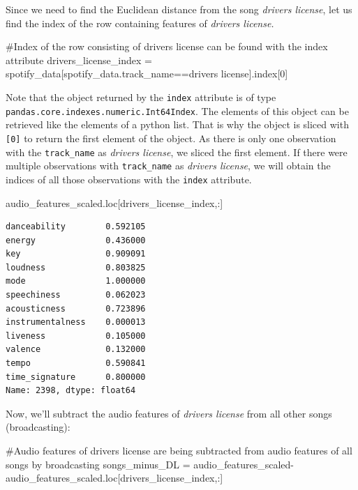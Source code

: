 \documentclass[
  letterpaper,
  DIV=11,
  numbers=noendperiod]{scrreprt}
\newenvironment{Shaded}{\begin{snugshade}}{\end{snugshade}}
\newcommand{\CommentTok}[1]{\textcolor[rgb]{0.37,0.37,0.37}{#1}}
\newcommand{\DecValTok}[1]{\textcolor[rgb]{0.68,0.00,0.00}{#1}}
\newcommand{\NormalTok}[1]{\textcolor[rgb]{0.00,0.23,0.31}{#1}}
\newcommand{\OperatorTok}[1]{\textcolor[rgb]{0.37,0.37,0.37}{#1}}
\newcommand{\StringTok}[1]{\textcolor[rgb]{0.13,0.47,0.30}{#1}}
\begin{document}
Since we need to find the Euclidean distance from the song \emph{drivers
license}, let us find the index of the row containing features of
\emph{drivers license.}

\begin{Shaded}
\begin{Highlighting}[]
\CommentTok{\#Index of the row consisting of drivers license can be found with the index attribute}
\NormalTok{drivers\_license\_index }\OperatorTok{=}\NormalTok{ spotify\_data[spotify\_data.track\_name}\OperatorTok{==}\StringTok{\textquotesingle{}drivers license\textquotesingle{}}\NormalTok{].index[}\DecValTok{0}\NormalTok{]}
\end{Highlighting}
\end{Shaded}

Note that the object returned by the \texttt{index} attribute is of type
\texttt{pandas.core.indexes.numeric.Int64Index}. The elements of this
object can be retrieved like the elements of a python list. That is why
the object is sliced with \texttt{{[}0{]}} to return the first element
of the object. As there is only one observation with the
\texttt{track\_name} as \emph{drivers license}, we sliced the first
element. If there were multiple observations with \texttt{track\_name}
as \emph{drivers license}, we will obtain the indices of all those
observations with the \texttt{index} attribute.

\begin{Shaded}
\begin{Highlighting}[]
\NormalTok{audio\_features\_scaled.loc[drivers\_license\_index,:]}
\end{Highlighting}
\end{Shaded}

\begin{verbatim}
danceability        0.592105
energy              0.436000
key                 0.909091
loudness            0.803825
mode                1.000000
speechiness         0.062023
acousticness        0.723896
instrumentalness    0.000013
liveness            0.105000
valence             0.132000
tempo               0.590841
time_signature      0.800000
Name: 2398, dtype: float64
\end{verbatim}

Now, we'll subtract the audio features of \emph{drivers license} from
all other songs (broadcasting):

\begin{Shaded}
\begin{Highlighting}[]
\CommentTok{\#Audio features of drivers license are being subtracted from audio features of all songs by broadcasting}
\NormalTok{songs\_minus\_DL }\OperatorTok{=}\NormalTok{ audio\_features\_scaled}\OperatorTok{{-}}\NormalTok{audio\_features\_scaled.loc[drivers\_license\_index,:]}
\end{Highlighting}
\end{Shaded}
\end{document}
